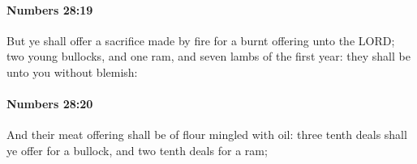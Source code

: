 		\paragraph{Numbers 28:19} %
			\label{NUMBERS-28-19}

			But ye shall offer a sacrifice made by fire for a burnt offering unto the LORD; two young bullocks, and one ram, and seven lambs of the first year: they shall be unto you without blemish:


		\paragraph{Numbers 28:20} %
			\label{NUMBERS-28-20}

			And their meat offering shall be of flour mingled with oil: three tenth deals shall ye offer for a bullock, and two tenth deals for a ram;


